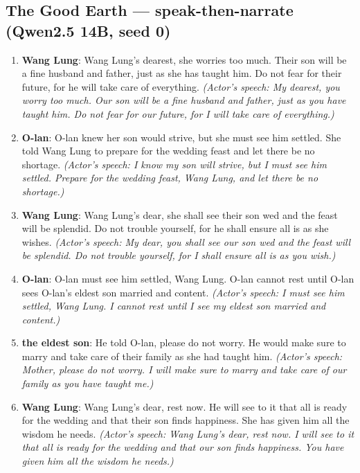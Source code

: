 \documentclass[10pt]{article}
\begin{document}
\subsection*{The Good Earth --- speak-then-narrate (Qwen2.5 14B, seed 0)}

\begin{enumerate}\setlength{\itemsep}{1pt}\small

\item \textbf{Wang Lung}: Wang Lung's dearest, she worries too much. Their son will be a fine husband and father, just as she has taught him. Do not fear for their future, for he will take care of everything. \emph{(Actor's speech: My dearest, you worry too much. Our son will be a fine husband and father, just as you have taught him. Do not fear for our future, for I will take care of everything.)}

\item \textbf{O-lan}: O-lan knew her son would strive, but she must see him settled. She told Wang Lung to prepare for the wedding feast and let there be no shortage. \emph{(Actor's speech: I know my son will strive, but I must see him settled. Prepare for the wedding feast, Wang Lung, and let there be no shortage.)}

\item \textbf{Wang Lung}: Wang Lung's dear, she shall see their son wed and the feast will be splendid. Do not trouble yourself, for he shall ensure all is as she wishes. \emph{(Actor's speech: My dear, you shall see our son wed and the feast will be splendid. Do not trouble yourself, for I shall ensure all is as you wish.)}

\item \textbf{O-lan}: O-lan must see him settled, Wang Lung. O-lan cannot rest until O-lan sees O-lan's eldest son married and content. \emph{(Actor's speech: I must see him settled, Wang Lung. I cannot rest until I see my eldest son married and content.)}

\item \textbf{the eldest son}: He told O-lan, please do not worry. He would make sure to marry and take care of their family as she had taught him. \emph{(Actor's speech: Mother, please do not worry. I will make sure to marry and take care of our family as you have taught me.)}

\item \textbf{Wang Lung}: Wang Lung's dear, rest now. He will see to it that all is ready for the wedding and that their son finds happiness. She has given him all the wisdom he needs. \emph{(Actor's speech: Wang Lung's dear, rest now. I will see to it that all is ready for the wedding and that our son finds happiness. You have given him all the wisdom he needs.)}


\end{enumerate}
\end{document}
